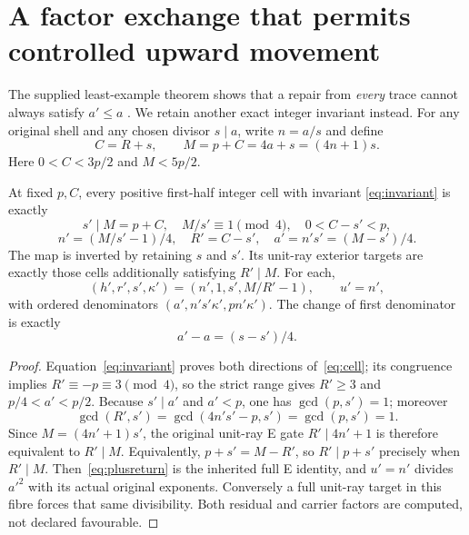 \section{A factor exchange that permits controlled upward movement}
The supplied least-example theorem shows that a repair from \emph{every} trace
cannot always satisfy $a'\le a$ \citep[\S7]{Previous}. We retain another exact
integer invariant instead. For any original shell and any chosen divisor
$s\mid a$, write $n=a/s$ and define
\begin{equation}\label{eq:invariant}
 C=R+s,\qquad M=p+C=4a+s=(4n+1)s.
\end{equation}
Here $0<C<3p/2$ and $M<5p/2$.

\begin{theorem}\label{thm:plus}
At fixed $p,C$, every positive first-half integer cell with invariant
\eqref{eq:invariant} is exactly
\[
 s'\mid M=p+C,\quad M/s'\equiv1\pmod4,\quad0<C-s'<p,
\]
\begin{equation}\label{eq:cell}
 n'=(M/s'-1)/4,\quad R'=C-s',\quad
 a'=n's'=(M-s')/4.
\end{equation}
The map is inverted by retaining $s$ and $s'$. Its unit-ray exterior targets
are exactly those cells additionally satisfying $R'\mid M$. For each,
\begin{equation}\label{eq:plusreturn}
 (h',r',s',\kappa')=(n',1,s',M/R'-1),\qquad u'=n',
\end{equation}
with ordered denominators $(a',n's'\kappa',pn'\kappa')$.
The change of first denominator is exactly
\[
 a'-a=(s-s')/4.
\]
\end{theorem}
\begin{proof}
Equation~\eqref{eq:invariant} proves both directions of~\eqref{eq:cell}; its
congruence implies $R'\equiv-p\equiv3\pmod4$, so the strict range gives
$R'\ge3$ and $p/4<a'<p/2$. Because $s'\mid a'$ and $a'<p$, one has
$\gcd(p,s')=1$; moreover
\[
 \gcd(R',s')=\gcd(4n's'-p,s')=\gcd(p,s')=1.
\]
Since $M=(4n'+1)s'$, the original unit-ray E gate
$R'\mid4n'+1$ is therefore equivalent to $R'\mid M$. Equivalently,
$p+s'=M-R'$, so $R'\mid p+s'$ precisely when $R'\mid M$.
Then~\eqref{eq:plusreturn} is the inherited full E identity, and
$u'=n'$ divides $a'^2$ with its actual original exponents.
Conversely a full unit-ray target in this fibre forces that same divisibility.
Both residual and carrier factors are computed, not declared favourable.
\end{proof}

